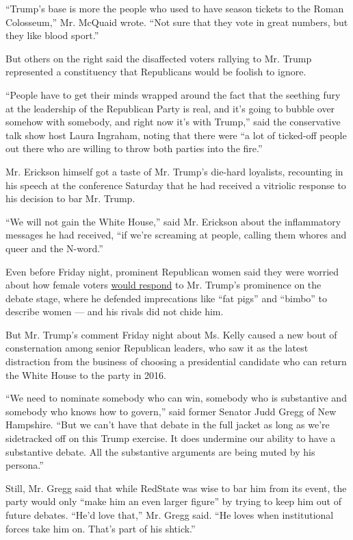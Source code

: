 ``Trump's base is more the people who used to have season tickets to the
Roman Colosseum,'' Mr. McQuaid wrote. ``Not sure that they vote in great
numbers, but they like blood sport.''

But others on the right said the disaffected voters rallying to Mr.
Trump represented a constituency that Republicans would be foolish to
ignore.

``People have to get their minds wrapped around the fact that the
seething fury at the leadership of the Republican Party is real, and
it's going to bubble over somehow with somebody, and right now it's with
Trump,'' said the conservative talk show host Laura Ingraham, noting
that there were ``a lot of ticked-off people out there who are willing
to throw both parties into the fire.''

Mr. Erickson himself got a taste of Mr. Trump's die-hard loyalists,
recounting in his speech at the conference Saturday that he had received
a vitriolic response to his decision to bar Mr. Trump.

``We will not gain the White House,'' said Mr. Erickson about the
inflammatory messages he had received, ``if we're screaming at people,
calling them whores and queer and the N-word.''

Even before Friday night, prominent Republican women said they were
worried about how female voters
\href{http://www.nytimes3xbfgragh.onion/2015/08/08/us/politics/fear-that-debate-could-hurt-gop-in-womens-eyes.html}{would
respond} to Mr. Trump's prominence on the debate stage, where he
defended imprecations like ``fat pigs'' and ``bimbo'' to describe women
--- and his rivals did not chide him.

But Mr. Trump's comment Friday night about Ms. Kelly caused a new bout
of consternation among senior Republican leaders, who saw it as the
latest distraction from the business of choosing a presidential
candidate who can return the White House to the party in 2016.

``We need to nominate somebody who can win, somebody who is substantive
and somebody who knows how to govern,'' said former Senator Judd Gregg
of New Hampshire. ``But we can't have that debate in the full jacket as
long as we're sidetracked off on this Trump exercise. It does undermine
our ability to have a substantive debate. All the substantive arguments
are being muted by his persona.''

Still, Mr. Gregg said that while RedState was wise to bar him from its
event, the party would only ``make him an even larger figure'' by trying
to keep him out of future debates. ``He'd love that,'' Mr. Gregg said.
``He loves when institutional forces take him on. That's part of his
shtick.''

